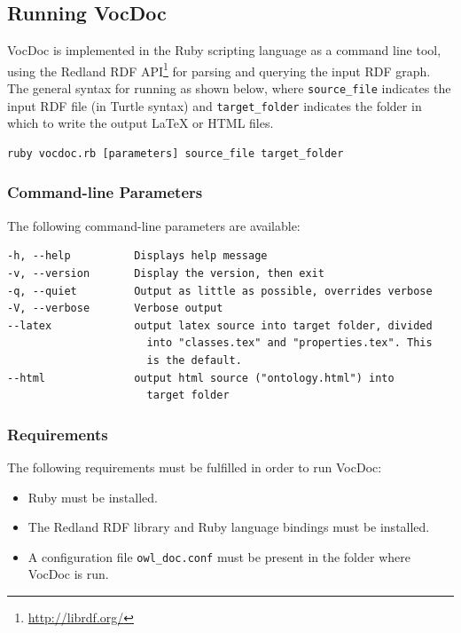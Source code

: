 \documentclass{article}
\begin{document}


\subsection{Running VocDoc} %
\label{sub:running_vocdoc}

VocDoc is implemented in the Ruby scripting language as a command line tool, using the Redland RDF API\footnote{\url{http://librdf.org/}} for parsing and querying the input RDF graph. The general syntax for running as shown below, where \texttt{source\_file} indicates the input RDF file (in Turtle syntax) and \texttt{target\_folder} indicates the folder in which to write the output La\TeX{} or HTML files.

\begin{verbatim}
ruby vocdoc.rb [parameters] source_file target_folder
\end{verbatim}

\subsubsection{Command-line Parameters} %
\label{ssub:command_line_parameters}

The following command-line parameters are available:

\singlespacing
\begin{verbatim}
-h, --help          Displays help message
-v, --version       Display the version, then exit
-q, --quiet         Output as little as possible, overrides verbose
-V, --verbose       Verbose output
--latex             output latex source into target folder, divided
                      into "classes.tex" and "properties.tex". This 
                      is the default.
--html              output html source ("ontology.html") into 
                      target folder
\end{verbatim}
\doublespacing


\subsubsection{Requirements} %
\label{ssub:requirements}

The following requirements must be fulfilled in order to run VocDoc:

\begin{itemize}
	\item Ruby must be installed.
	\item The Redland RDF library and Ruby language bindings must be installed.
	\item A configuration file \texttt{owl\_doc.conf} must be present in the folder where VocDoc is run.
\end{itemize}
\end{document}
